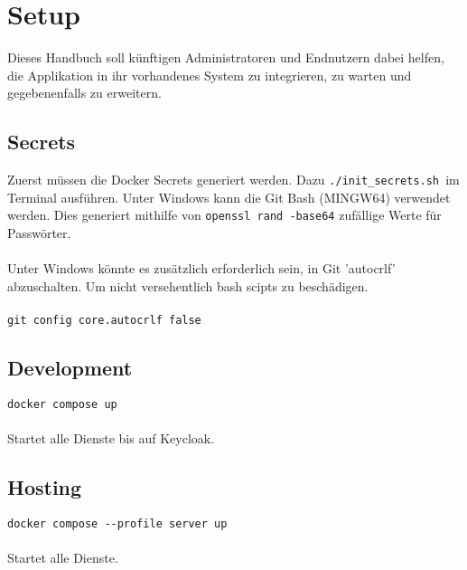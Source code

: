 \chapter{Setup}\label{ch:setup}

Dieses Handbuch soll künftigen Administratoren und Endnutzern dabei helfen,
die Applikation in ihr vorhandenes System zu integrieren, zu warten und gegebenenfalls zu erweitern.

\section{Secrets}\label{sec:secrets}

Zuerst müssen die Docker Secrets generiert werden. Dazu \verb|./init_secrets.sh |im Terminal 
ausführen. Unter Windows kann die Git Bash (MINGW64) verwendet werden. Dies generiert mithilfe von 
\verb|openssl rand -base64| zufällige Werte für Passwörter. \\
\\
Unter Windows könnte es zusätzlich erforderlich sein, in Git 'autocrlf' abzuschalten. Um nicht versehentlich bash scipts zu beschädigen.\\
\\
\verb|git config core.autocrlf false|\\
\section{Development}
\verb|docker compose up|\\
\\
Startet alle Dienste bis auf Keycloak.
\section{Hosting}
\verb|docker compose --profile server up|\\
\\
Startet alle Dienste.
